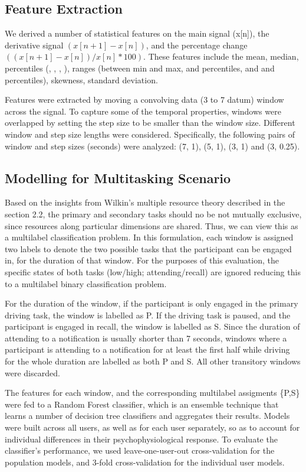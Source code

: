 \subsection{Feature Extraction}
We derived a number of statistical features on the main signal (x[n]), the derivative signal $(x[n+1] - x[n])$, and the percentage change $((x[n+1] - x[n])/x[n] * 100)$. These features include the mean, median, percentiles (, , , ), ranges (between min and max,  and  percentiles, and  and  percentiles), skewness, standard deviation.

Features were extracted by moving a convolving data (3 to 7 datum) window across the signal. To capture some of the temporal properties, windows were overlapped by setting the step size to be smaller than the window size. Different window and step size lengths were considered. Specifically, the following pairs of window and step sizes (seconds) were analyzed: (7, 1), (5, 1), (3, 1) and (3, 0.25). 

\subsection{Modelling for Multitasking Scenario}
Based on the insights from Wilkin's multiple resource theory described in the section 2.2,  the primary and secondary tasks should no be not mutually exclusive, since resources along particular dimensions are shared. Thus, we can view this as a multilabel classification problem. In this formulation, each window is assigned two labels to denote the two possible tasks that the participant can be engaged in, for the duration of that window. For the purposes of this evaluation, the specific states of both tasks (low/high; attending/recall) are ignored reducing this to a multilabel binary classification problem. 

For the duration of the window, if the participant is only engaged in the primary driving task, the window is labelled as P. If the driving task is paused, and the participant is engaged in recall, the window is labelled as S. Since the duration of attending to a notification is usually shorter than 7 seconds, windows where a participant is attending to a notification for at least the first half while driving for the whole duration are labelled as both P and S. All other transitory windows were discarded.   

The features for each window, and the corresponding multilabel assigments \{P,S\} were fed to a Random Forest classifier, which is an ensemble technique that learns a number of decision tree classifiers and aggregates their results. Models were built across all users, as well as for each user separately, so as to account for individual differences in their psychophysiological response. To evaluate the classifier's performance, we used leave-one-user-out cross-validation for the population models, and 3-fold cross-validation for the individual user models. 


